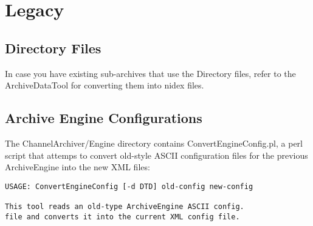 \chapter{Legacy}

\section{Directory Files}
In case you have existing sub-archives that use the Directory files,
refer to the ArchiveDataTool for converting them into nidex files.

\section{Archive Engine Configurations}
The ChannelArchiver/Engine directory contains ConvertEngineConfig.pl,
a perl script that attemps to convert old-style ASCII configuration
files for the previous ArchiveEngine into the new XML files:
\begin{lstlisting}[keywordstyle=\sffamily]
USAGE: ConvertEngineConfig [-d DTD] old-config new-config
 
This tool reads an old-type ArchiveEngine ASCII config.
file and converts it into the current XML config file.
\end{lstlisting}

